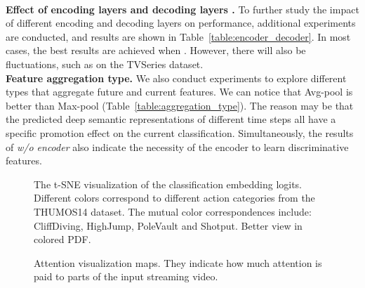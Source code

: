 \documentclass[10pt,twocolumn,letterpaper]{article}
\begin{document}
{\\
\textbf{Effect of encoding layers  and decoding layers .} To further study the impact of different encoding and decoding layers on performance, additional experiments are conducted, and results are shown in Table~\ref{table:encoder_decoder}. In most cases, the best results are achieved when . However, there will also be fluctuations, such as on the TVSeries dataset. 
\vspace{+3pt}
\\
\textbf{Feature aggregation type.} We also conduct experiments to explore different types that aggregate future and current features. We can notice that Avg-pool is better than Max-pool (Table~\ref{table:aggregation_type}). The reason may be that the predicted deep semantic representations of different time steps all have a specific promotion effect on the current classification. Simultaneously, the results of \textit{w/o encoder} also indicate the necessity of the encoder to learn discriminative features. 

\begin{figure}[t!]
\centering
{}
\hspace{1mm}
\vspace{-6mm}
\caption{\label{figure-visual-1}The t-SNE visualization of the classification embedding logits. Different colors correspond to different action categories from the THUMOS14 dataset. The mutual color correspondences include: \textcolor[RGB]{241,125,31}{CliffDiving}, \textcolor[RGB]{148,181,81}{HighJump}, \textcolor[RGB]{104,50,6}{PoleVault} and \textcolor[RGB]{211,222,252}{Shotput}. Better view in colored PDF.
}
\vspace{-4mm}
\end{figure}
\begin{figure}[t!]
\centering
{} 
\vspace{-1mm}
\caption{\label{figure-visual-2}Attention visualization maps. They indicate how much attention is paid to parts of the input streaming video. 
}
\vspace{-4mm}
\end{figure}
}
\end{document}
